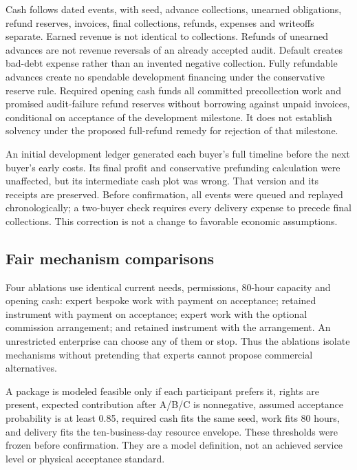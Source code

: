 \documentclass[
  11pt,
]{article}
\let\OriginalSubsection\subsection
\renewcommand{\subsection}{\needspace{6\baselineskip}\OriginalSubsection}
\begin{document}
Cash follows dated events, with seed, advance collections, unearned
obligations, refund reserves, invoices, final collections, refunds,
expenses and writeoffs separate. Earned revenue is not identical to
collections. Refunds of unearned advances are not revenue reversals of
an already accepted audit. Default creates bad-debt expense rather than
an invented negative collection. Fully refundable advances create no
spendable development financing under the conservative reserve rule.
Required opening cash funds all committed precollection work and
promised audit-failure refund reserves without borrowing against unpaid
invoices, conditional on acceptance of the development milestone. It
does not establish solvency under the proposed full-refund remedy for
rejection of that milestone.

An initial development ledger generated each buyer's full timeline
before the next buyer's early costs. Its final profit and conservative
prefunding calculation were unaffected, but its intermediate cash plot
was wrong. That version and its receipts are preserved. Before
confirmation, all events were queued and replayed chronologically; a
two-buyer check requires every delivery expense to precede final
collections. This correction is not a change to favorable economic
assumptions.

\hypertarget{fair-mechanism-comparisons}{%
\subsection{Fair mechanism
comparisons}\label{fair-mechanism-comparisons}}

Four ablations use identical current needs, permissions, 80-hour
capacity and opening cash: expert bespoke work with payment on
acceptance; retained instrument with payment on acceptance; expert work
with the optional commission arrangement; and retained instrument with
the arrangement. An unrestricted enterprise can choose any of them or
stop. Thus the ablations isolate mechanisms without pretending that
experts cannot propose commercial alternatives.

A package is modeled feasible only if each participant prefers it,
rights are present, expected contribution after A/B/C is nonnegative,
assumed acceptance probability is at least 0.85, required cash fits the
same seed, work fits 80 hours, and delivery fits the ten-business-day
resource envelope. These thresholds were frozen before confirmation.
They are a model definition, not an achieved service level or physical
acceptance standard.
\end{document}
